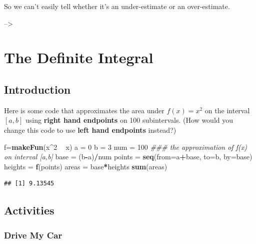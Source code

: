 \documentclass[
]{book}
\newenvironment{Shaded}{\begin{snugshade}}{\end{snugshade}}
\newcommand{\CommentTok}[1]{\textcolor[rgb]{0.56,0.35,0.01}{\textit{#1}}}
\newcommand{\DataTypeTok}[1]{\textcolor[rgb]{0.13,0.29,0.53}{#1}}
\newcommand{\DecValTok}[1]{\textcolor[rgb]{0.00,0.00,0.81}{#1}}
\newcommand{\KeywordTok}[1]{\textcolor[rgb]{0.13,0.29,0.53}{\textbf{#1}}}
\newcommand{\NormalTok}[1]{#1}
\newcommand{\OperatorTok}[1]{\textcolor[rgb]{0.81,0.36,0.00}{\textbf{#1}}}
\newcommand{\StringTok}[1]{\textcolor[rgb]{0.31,0.60,0.02}{#1}}
\begin{document}
So we can't easily tell whether it's an under-estimate or an over-estimate.

--\textgreater{}

\hypertarget{the-definite-integral}{%
\chapter{The Definite Integral}\label{the-definite-integral}}

\hypertarget{introduction}{%
\section{Introduction}\label{introduction}}

Here is some code that approximates the area under \(f(x)=x^2\) on the interval \([a,b]\) using \textbf{right hand endpoints} on 100 subintervals. (How would you change this code to use \textbf{left hand endpoints} instead?)

\begin{Shaded}
\begin{Highlighting}[]
\NormalTok{f=}\KeywordTok{makeFun}\NormalTok{(x}\OperatorTok{^}\DecValTok{2} \OperatorTok{~}\StringTok{ }\NormalTok{x)}
\NormalTok{a =}\StringTok{ }\DecValTok{0}
\NormalTok{b =}\StringTok{ }\DecValTok{3}
\NormalTok{num =}\StringTok{ }\DecValTok{100}
\CommentTok{### the approximation of f(x) on interval [a,b]}
\NormalTok{base =}\StringTok{ }\NormalTok{(b}\OperatorTok{-}\NormalTok{a)}\OperatorTok{/}\NormalTok{num}
\NormalTok{points =}\StringTok{ }\KeywordTok{seq}\NormalTok{(}\DataTypeTok{from=}\NormalTok{a}\OperatorTok{+}\NormalTok{base, }\DataTypeTok{to=}\NormalTok{b, }\DataTypeTok{by=}\NormalTok{base)}
\NormalTok{heights =}\StringTok{ }\KeywordTok{f}\NormalTok{(points)}
\NormalTok{areas =}\StringTok{ }\NormalTok{base}\OperatorTok{*}\NormalTok{heights}
\KeywordTok{sum}\NormalTok{(areas)}
\end{Highlighting}
\end{Shaded}

\begin{verbatim}
## [1] 9.13545
\end{verbatim}

\hypertarget{activities-22}{%
\section{Activities}\label{activities-22}}

\hypertarget{drive-my-car}{%
\subsection{Drive My Car}\label{drive-my-car}}
\end{document}
